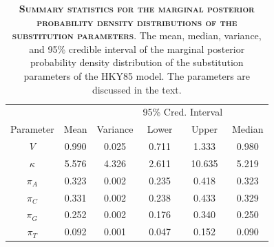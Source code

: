 \documentclass{svmult}
\begin{document}
\begin{table}[b]
\centering
\caption{\textbf{\textsc{Summary statistics for the marginal posterior probability density
distributions of the substitution parameters}}.  The mean, median, variance, and 95\% credible
interval of the marginal posterior probability density distribution of the substitution
parameters of the HKY85 model. The parameters are discussed in the text.}

\begin{tabular}{cccccc}
                    &             &                  & \multicolumn{2}{c}{95\% Cred. Interval} & \\ \cline{4-5}
Parameter & Mean & Variance & Lower & Upper & Median \\ \hline
$V$           &  0.990  &  0.025  &  0.711   & 1.333  &  0.980   \\
$\kappa$ &  5.576  &  4.326 &  2.611 &  10.635  &  5.219   \\
$\pi_A$    &  0.323  &  0.002  &  0.235  &  0.418  &  0.323   \\
$\pi_C$    &  0.331  &  0.002  &  0.238  &  0.433 &  0.329   \\
$\pi_G$    &  0.252  &  0.002  &  0.176  &  0.340 &   0.250   \\
$\pi_T$     &  0.092  &  0.001 &   0.047  &  0.152 &  0.090   \\ \hline
\end{tabular}

\label{tab2}
\end{table}
\end{document}
